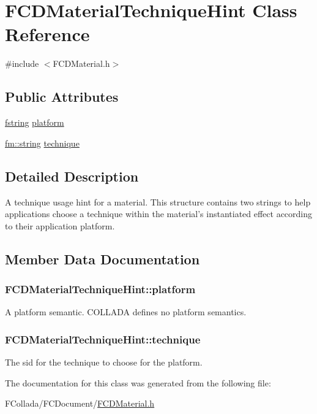 \hypertarget{classFCDMaterialTechniqueHint}{
\section{FCDMaterialTechniqueHint Class Reference}
\label{classFCDMaterialTechniqueHint}
}


{\ttfamily \#include $<$FCDMaterial.h$>$}

\subsection*{Public Attributes}
\begin{DoxyCompactItemize}
\item 
\hyperlink{classfm_1_1stringT}{fstring} \hyperlink{classFCDMaterialTechniqueHint_a989eee193086807edd2729859ca755aa}{platform}
\item 
\hyperlink{classfm_1_1stringT}{fm::string} \hyperlink{classFCDMaterialTechniqueHint_a7fdc8336e10d168d95e046e423154285}{technique}
\end{DoxyCompactItemize}


\subsection{Detailed Description}
A technique usage hint for a material. This structure contains two strings to help applications choose a technique within the material's instantiated effect according to their application platform. 

\subsection{Member Data Documentation}
\hypertarget{classFCDMaterialTechniqueHint_a989eee193086807edd2729859ca755aa}{
\subsubsection[{platform}]{ {\bf FCDMaterialTechniqueHint::platform}}}
\label{classFCDMaterialTechniqueHint_a989eee193086807edd2729859ca755aa}
A platform semantic. COLLADA defines no platform semantics. \hypertarget{classFCDMaterialTechniqueHint_a7fdc8336e10d168d95e046e423154285}{
\subsubsection[{technique}]{ {\bf FCDMaterialTechniqueHint::technique}}}
\label{classFCDMaterialTechniqueHint_a7fdc8336e10d168d95e046e423154285}
The sid for the technique to choose for the platform. 

The documentation for this class was generated from the following file:\begin{DoxyCompactItemize}
\item 
FCollada/FCDocument/\hyperlink{FCDMaterial_8h}{FCDMaterial.h}\end{DoxyCompactItemize}
